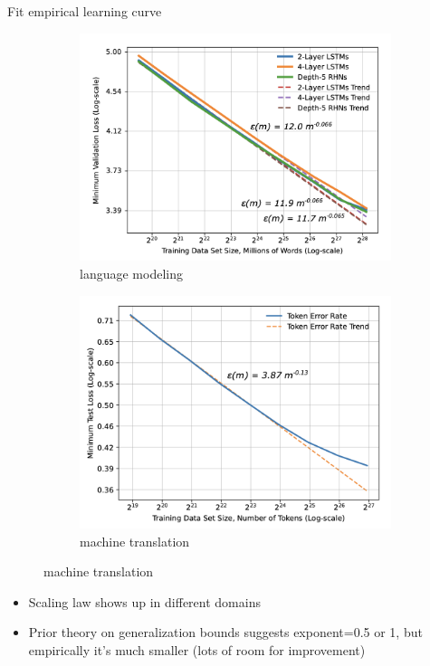 \documentclass[usenames,dvipsnames,notes,11pt,aspectratio=169,hyperref={colorlinks=true, linkcolor=blue}]{beamer}
\begin{document}
\begin{frame}
    {Fit empirical learning curve}
    \begin{figure}
        \begin{subfigure}{0.45\textwidth}
        \includegraphics[height=0.5\textheight]{figures/lm-scaling}
        \caption{language modeling}
        \end{subfigure}
        \begin{subfigure}{0.45\textwidth}
        \includegraphics[height=0.5\textheight]{figures/mt-scaling}
        \caption{machine translation}
        \end{subfigure}
    \end{figure}
    \begin{itemize}
        \item Scaling law shows up in different domains
        \item Prior theory on generalization bounds suggests exponent=0.5 or 1, but empirically it's much smaller (lots of room for improvement)
    \end{itemize}
\end{frame}
\end{document}
